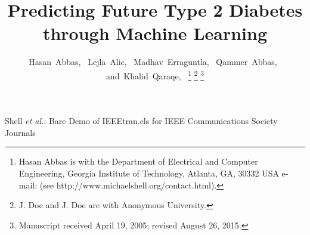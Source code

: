 \documentclass[journal,comsoc]{IEEEtran}
\begin{document}
%
\title{Predicting Future Type 2 Diabetes through Machine Learning}
%
%

\author{Hasan~Abbas,~
        Lejla~Alic,~
        Madhav~Erraguntla,~
        Qammer~Abbas,~
        and~Khalid~Qaraqe,~%
\thanks{Hasan Abbas is with the Department
of Electrical and Computer Engineering, Georgia Institute of Technology, Atlanta,
GA, 30332 USA e-mail: (see http://www.michaelshell.org/contact.html).}%
\thanks{J. Doe and J. Doe are with Anonymous University.}%
\thanks{Manuscript received April 19, 2005; revised August 26, 2015.}}

%
%



%
{Shell \MakeLowercase{\textit{et al.}}: Bare Demo of IEEEtran.cls for IEEE Communications Society Journals}
%
\end{document}
